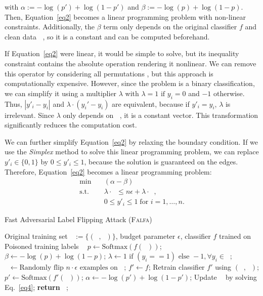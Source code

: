 \documentclass[runningheads]{llncs}
\newcommand{\falfa}{\textsc{Falfa}\xspace}
\DeclareMathOperator*{\Xtr}{\mathcal{X}_\text{train}}
\DeclareMathOperator*{\ytr}{\mathcal{Y}_\text{train}}
\DeclareMathOperator*{\ypo}{\mathcal{Y}^\prime_\text{train}}
\DeclareMathOperator*{\Dtr}{\mathcal{D}_\text{train}}
\begin{document}
\noindent with $\alpha := -\log(p') + \log(1-p')$ and $\beta := -\log(p) + \log(1-p)$.
Then, Equation~\ref{eq2} becomes a linear programming problem with non-linear constraints.
Additionally, the $\beta$ term only depends on the original classifier $f$ and clean data $\Dtr$, so it is a constant and can be computed beforehand.

If Equation~\ref{eq2} were linear, it would be simple to solve, but its inequality constraint contains the absolute operation rendering it nonlinear.
We can remove this operator by considering all permutations \cite{paudice2018label},
but this approach is computationally expensive.
However, since the problem is a binary classification, we can simplify it using a multiplier
$\lambda$ with $\lambda = 1 \text{ if } y_i = 0$ and $-1$ otherwise.
Thus, $|y'_i-y_i|$ and $\lambda \cdot (y_i' - y_i)$ are equivalent, because if $y'_i=y_i$,
$\lambda$ is irrelevant.
Since $\lambda$ only depends on $\ytr$, it is a constant vector.
This transformation significantly reduces the computation cost.

We can further simplify Equation~\ref{eq2} by relaxing the boundary condition.
If we use the {\em Simplex} method to solve this linear programming problem, we can replace $y'_i \in \{0, 1\}$ by $0 \leq y'_i \leq 1$, because the solution is guaranteed on the edges.
Therefore, Equation~\ref{eq2} becomes a linear programming problem:
\begin{equation}
    \begin{aligned}
        \min_{\ypo} \quad   & (\alpha - \beta)\ypo                                      \\
        \textrm{s.t.} \quad & \lambda \cdot \ypo \leq  n \epsilon + \lambda \cdot \ytr, \\
        \quad               & 0 \leq y'_i \leq 1  \; \text{for } i = 1,  \ldots, n.
    \end{aligned}
    \label{eq4}
\end{equation}

\begin{algorithm}[t!]
    \footnotesize
    \caption{Fast Adversarial Label Flipping Attack (\falfa)}
    \begin{algorithmic}[1]
        \Require
        Original training set $\Dtr:=\{(\Xtr, \ytr)\}$, budget parameter $\epsilon$, classifier $f$ trained on $\Dtr$
        \Ensure
        Poisoned training labels $\ypo$
        \State $p \gets \text{Softmax}(f(\Xtr))$;
        \State $\beta \gets -\log(p) + \log(1-p)$;
        \State $\lambda \gets 1 \text{ if } (y_i == 1) \text{ else } -1,  \forall y_i \in \ytr$;
        \State $\ypo \gets \text{Randomly flip } n \cdot \epsilon \text{ examples on } \ytr$;
        \State $f' \gets f$;
        \While{$\ypo$ does not converge}
        \State Retrain classifier $f'$ using $(\Xtr, \ypo)$;
        \State $p' \gets \text{Softmax}(f'(\Xtr))$;
        \State $\alpha \gets - \log(p') + \log(1-p')$;
        \State Update $\ypo$ by solving Eq.~\ref{eq4};
        \EndWhile
        \State \textbf{return} $\ypo$;
    \end{algorithmic}
    \label{alg.flfa}
\end{algorithm}
\end{document}
